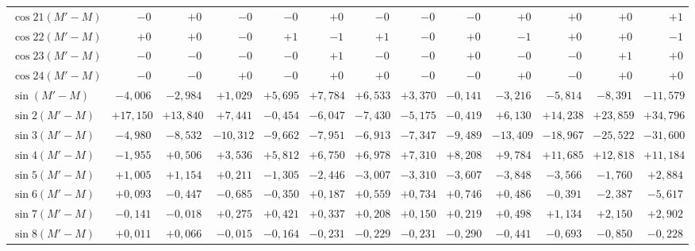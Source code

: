 \begin{landscape}
\begin{longtable}{@{}l|r|r|r|r|r|r|r|r|r|r|r|r@{}}
\(\cos 21(M'-M)\) & \(-0\) & \(+0\) & \(-0\) & \(-0\) & \(+0\) & \(-0\) & \(-0\) & \(-0\) & \(+0\) & \(+0\) & \(+0\) & \(+1\)\\
\(\cos 22(M'-M)\) & \(+0\) & \(+0\) & \(-0\) & \(+1\) & \(-1\) & \(+1\) & \(-0\) & \(+0\) & \(-1\) & \(+0\) & \(+0\) & \(-1\)\\
\(\cos 23(M'-M)\) & \(-0\) & \(-0\) & \(-0\) & \(-0\) & \(+1\) & \(-0\) & \(-0\) & \(+0\) & \(-0\) & \(-0\) & \(+1\) & \(+0\)\\
\(\cos 24(M'-M)\) & \(-0\) & \(-0\) & \(+0\) & \(-0\) & \(+0\) & \(+0\) & \(-0\) & \(-0\) & \(+0\) & \(-0\) & \(+0\) & \(+0\)\\[6pt]
\(\sin(M'-M)\) & \(-4{,}006\) & \(-2{,}984\) & \(+1{,}029\) & \(+5{,}695\) & \(+7{,}784\) & \(+6{,}533\) & \(+3{,}370\) & \(-0{,}141\) & \(-3{,}216\) & \(-5{,}814\) & \(-8{,}391\) & \(-11{,}579\)\\
\(\sin 2(M'-M)\) & \(+17{,}150\) & \(+13{,}840\) & \(+7{,}441\) & \(-0{,}454\) & \(-6{,}047\) & \(-7{,}430\) & \(-5{,}175\) & \(-0{,}419\) & \(+6{,}130\) & \(+14{,}238\) & \(+23{,}859\) & \(+34{,}796\)\\
\(\sin 3(M'-M)\) & \(-4{,}980\) & \(-8{,}532\) & \(-10{,}312\) & \(-9{,}662\) & \(-7{,}951\) & \(-6{,}913\) & \(-7{,}347\) & \(-9{,}489\) & \(-13{,}409\) & \(-18{,}967\) & \(-25{,}522\) & \(-31{,}600\)\\
\(\sin 4(M'-M)\) & \(-1{,}955\) & \(+0{,}506\) & \(+3{,}536\) & \(+5{,}812\) & \(+6{,}750\) & \(+6{,}978\) & \(+7{,}310\) & \(+8{,}208\) & \(+9{,}784\) & \(+11{,}685\) & \(+12{,}818\) & \(+11{,}184\)\\
\(\sin 5(M'-M)\) & \(+1{,}005\) & \(+1{,}154\) & \(+0{,}211\) & \(-1{,}305\) & \(-2{,}446\) & \(-3{,}007\) & \(-3{,}310\) & \(-3{,}607\) & \(-3{,}848\) & \(-3{,}566\) & \(-1{,}760\) & \(+2{,}884\)\\
\(\sin 6(M'-M)\) & \(+0{,}093\) & \(-0{,}447\) & \(-0{,}685\) & \(-0{,}350\) & \(+0{,}187\) & \(+0{,}559\) & \(+0{,}734\) & \(+0{,}746\) & \(+0{,}486\) & \(-0{,}391\) & \(-2{,}387\) & \(-5{,}617\)\\
\(\sin 7(M'-M)\) & \(-0{,}141\) & \(-0{,}018\) & \(+0{,}275\) & \(+0{,}421\) & \(+0{,}337\) & \(+0{,}208\) & \(+0{,}150\) & \(+0{,}219\) & \(+0{,}498\) & \(+1{,}134\) & \(+2{,}150\) & \(+2{,}902\)\\
\(\sin 8(M'-M)\) & \(+0{,}011\) & \(+0{,}066\) & \(-0{,}015\) & \(-0{,}164\) & \(-0{,}231\) & \(-0{,}229\) & \(-0{,}231\) & \(-0{,}290\) & \(-0{,}441\) & \(-0{,}693\) & \(-0{,}850\) & \(-0{,}228\)\\

\end{longtable}
\end{landscape}

